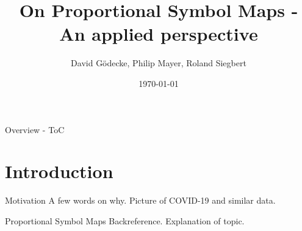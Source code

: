 \documentclass{beamer}
\title{On Proportional Symbol Maps - An applied perspective}
\date{\today}
\author{David Gödecke, Philip Mayer, Roland Siegbert}
\institute{Geometry Lab SS 2020}
\begin{document}
  \maketitle

  \begin{frame}{Overview - ToC}
    \tableofcontents
  \end{frame}

  \section{Introduction}

  \begin{frame}{Motivation}
    A few words on why.
    Picture of COVID-19 and similar data.
  \end{frame}

  \begin{frame}{Proportional Symbol Maps}
    Backreference.
    Explanation of topic.
  \end{frame}
\end{document}
